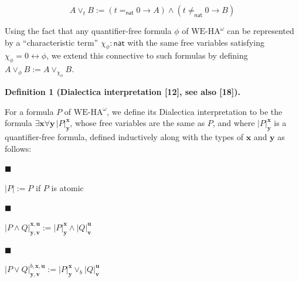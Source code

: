 \par  \quad  \[A\vee_{t}B:=(t=_{\mathsf{nat}}0\to A)\wedge(t\neq_{\mathsf{nat}}0\to B)\]\quad  \quad  
  
Using the fact that any quantifier-free formula $\phi$ of $\mathrm{WE}\mbox{-}\mathrm{HA}^{\omega}$ can be represented by a “characteristic term” $\chi_{\phi}:\mathsf{nat}$ with the same free variables satisfying $\chi_{\phi}=0\leftrightarrow\phi$, we extend this connective to such formulas by defining $A\vee_{\phi}B:=A\vee_{\chi_{\phi}}B$.\par
 
 
 
\par\medskip\noindent\textbf{Definition 1 (Dialectica interpretation [12], see also [18]).}\par
 
 
For a formula $P$ of $\mathrm{WE}\mbox{-}\mathrm{HA}^{\omega}$, we define its Dialectica interpretation to be the formula $\exists\bm{x}\forall\bm{y}\,|{P}|^{\bm{x}}_{\bm{y}}$, whose free variables are the same as $P$, and where $|{P}|^{\bm{x}}_{\bm{y}}$ is a quantifier-free formula, defined inductively along with the types of $\bm{x}$ and $\bm{y}$ as follows:\par
 
 
  
\par\noindent  $\blacksquare$ 
 
$|{P}|:=P$ if $P$ is atomic\par
 
 
 
\par\noindent  $\blacksquare$ 
 
$|{P\wedge Q}|^{\bm{x},\bm{u}}_{\bm{y},\bm{v}}:=|{P}|^{\bm{x}}_{\bm{y}}\wedge|{Q}|^{\bm{u}}_{\bm{v}}$\par
 
 
 
\par\noindent  $\blacksquare$ 
 
$|{P\vee Q}|^{b,\bm{x},\bm{u}}_{\bm{y},\bm{v}}:=|{P}|^{\bm{x}}_{\bm{y}}\vee_{b}|{Q}|^{\bm{u}}_{\bm{v}}$\par
 
